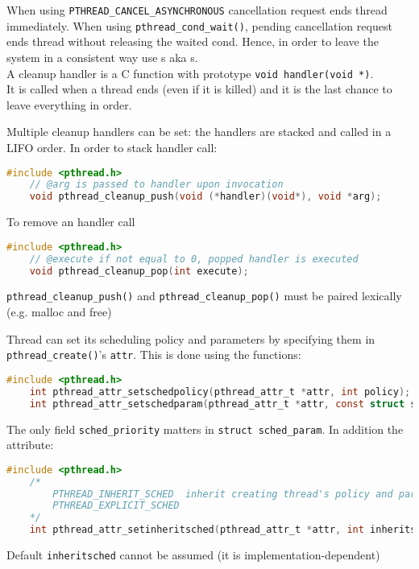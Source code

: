 When using \texttt{PTHREAD\_CANCEL\_ASYNCHRONOUS} cancellation request ends thread immediately. When using \texttt{pthread\_cond\_wait()}, pending cancellation request ends thread without releasing the waited cond. Hence, in order to leave the system in a consistent way use s aka s.\\
A cleanup handler is a C function with prototype \texttt{void handler(void *)}.\\
It is called when a thread ends (even if it is killed) and it is the last chance to leave everything in order.

Multiple cleanup handlers can be set: the handlers are stacked and called in a LIFO order. In order to stack handler call:
\begin{lstlisting}[language=C]
    #include <pthread.h>
    // @arg is passed to handler upon invocation
    void pthread_cleanup_push(void (*handler)(void*), void *arg);
\end{lstlisting}
To remove an handler call
\begin{lstlisting}[language=C]
    #include <pthread.h>
    // @execute if not equal to 0, popped handler is executed
    void pthread_cleanup_pop(int execute);
\end{lstlisting}
\texttt{pthread\_cleanup\_push()} and \texttt{pthread\_cleanup\_pop()} must be paired lexically (e.g. malloc and free)

Thread can set its scheduling policy and parameters by specifying them in \texttt{pthread\_create()}'s \texttt{attr}. This is done using the functions:
\begin{lstlisting}[language=C]
    #include <pthread.h>
    int pthread_attr_setschedpolicy(pthread_attr_t *attr, int policy);
    int pthread_attr_setschedparam(pthread_attr_t *attr, const struct sched_param *param);
\end{lstlisting}

The only field \texttt{sched\_priority} matters in \texttt{struct sched\_param}.
In addition the attribute:
\begin{lstlisting}[language=C]
    #include <pthread.h>
    /*
        PTHREAD_INHERIT_SCHED  inherit creating thread's policy and parameters 
        PTHREAD_EXPLICIT_SCHED 
    */
    int pthread_attr_setinheritsched(pthread_attr_t *attr, int inheritsched);
\end{lstlisting}

Default \texttt{inheritsched} cannot be assumed (it is implementation-dependent)

